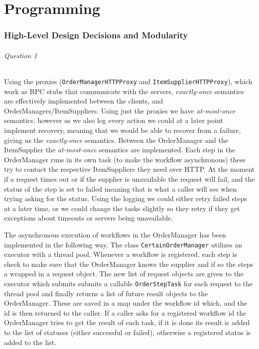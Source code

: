 \documentclass[a4paper, 11pt]{article}
\begin{document}



\newpage
\part{Programming} %
\label{prt:programming_}

\section{High-Level Design Decisions and Modularity} %
\label{sec:high_level_design_decisions_and_modularity}

\paragraph{Question 1} %
\label{par:question_1}

Using the proxies (\texttt{OrderManagerHTTPProxy} and \texttt{Item\-SupplierHTTPProxy}), which work as RPC stubs that communicate with the servers, \textit{exactly-once} semantics are effectively implemented between the clients, and OrderManagers/ItemSuppliers. Using just the proxies we have \textit{at-most-once} semantics, however as we also log every action we could at a later point implement recovery, meaning that we would be able to recover from a failure, giving us the \textit{exactly-once} semantics. Between the OrderManager and the ItemSupplier the \textit{at-most-once} semantics are implemented. Each step in the OrderManager runs in its own task (to make the workflow asynchronous) these try to contact the respective ItemSuppliers they need over HTTP. At the moment if a request times out or if the supplier is unavailable the request will fail, and the status of the step is set to failed meaning that is what a caller will see when trying asking for the status. Using the logging we could either retry failed steps at a later time, or we could change the tasks slightly so they retry if they get exceptions about timeouts or servers being unavailable.

The asynchronous execution of workflows in the OrderManager has been implemented in the following way. The class \texttt{CertainOrderManager} utilizes an executor with a thread pool. Whenever a workflow is registered, each step is check to make sure that the OrderManager knows the supplier and if so the steps a wrapped in a request object. The new list of request objects are given to the executor which submits submits a callable \texttt{OrderStepTask} for each request to the thread pool and finally returns a list of future result objects to the OrderManager. These are saved in a map under the workflow id which, and the id is then returned to the caller. If a caller asks for a registered workflow id the OrderManager tries to get the result of each task, if it is done its result is added to the list of statuses (either successful or failed), otherwise a registered status is added to the list.
\end{document}
